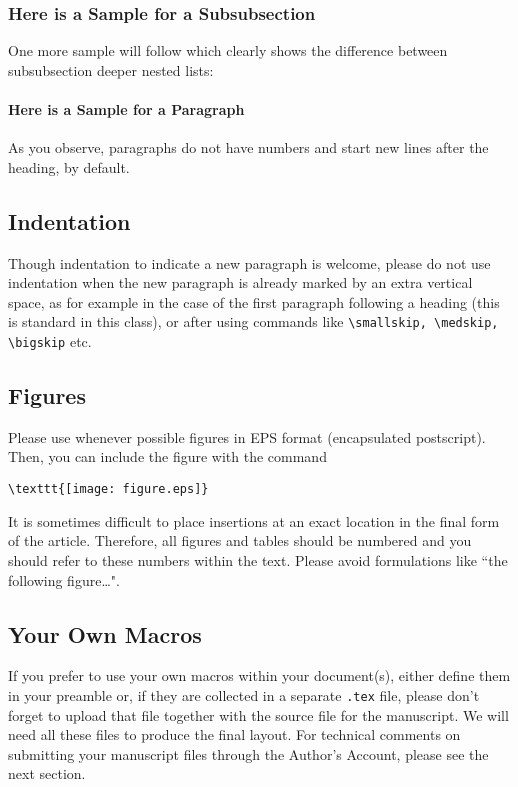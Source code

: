 \documentclass{birkjour}
\theoremstyle{definition}
\theoremstyle{remark}
\numberwithin{equation}{section}
\begin{document}
\subsubsection{Here is a Sample for a Subsubsection}

One more sample will follow which clearly shows the difference between subsubsection deeper nested lists:

\paragraph{Here is a Sample for a Paragraph}

As you observe, paragraphs do not have numbers and start new lines after the heading, by default.

\subsection{Indentation}
Though indentation to indicate a new paragraph is welcome, please
do not use indentation when the new paragraph is already marked by
an extra vertical space, as for example in the case of the first
paragraph following a heading (this is standard in this class), or
after using commands like
\verb+\smallskip, \medskip, \bigskip+ etc.


\subsection{Figures}

Please use whenever possible figures in EPS format (encapsulated postscript). Then, you can include the figure with the command

\begin{verbatim}\texttt{[image: figure.eps]}\end{verbatim}

It is sometimes difficult to place insertions at an exact location
in the final form of the article. Therefore, all figures and tables
should be numbered and you should refer to these numbers within
the text. Please avoid formulations like ``the following
figure\dots".

\subsection{Your Own Macros}

If you prefer to use your own macros within your document(s), either define them in your preamble or, if they are collected in a separate \texttt{.tex} file, please don't forget to upload  that file together with the source file for the manuscript. We will need all these files to produce the final layout. For technical comments on submitting your manuscript files through the Author's Account, please see the next section.
\end{document}
